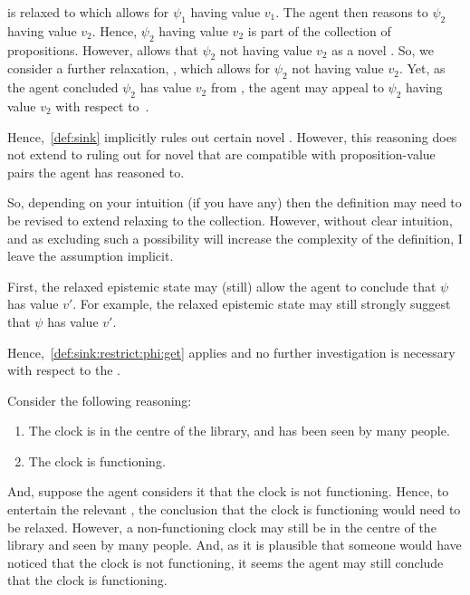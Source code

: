 \begin{note}
{    \eState{} is relaxed to  which allows for \(\psi_{1}\) having value \(v_{1}\).
    The agent then reasons to \(\psi_{2}\) having value \(v_{2}\).
    Hence, \(\psi_{2}\) having value \(v_{2}\) is part of the collection of propositions.
    However,  allows that \(\psi_{2}\) not having value \(v_{2}\) as a novel \epPAd{}.
    So, we consider a further relaxation, , which allows for \(\psi_{2}\) not having value \(v_{2}\).
    Yet, as the agent concluded \(\psi_{2}\) has value \(v_{2}\) from , the agent may appeal to \(\psi_{2}\) having value \(v_{2}\) with respect to~.

    Hence,~\autoref{def:sink} implicitly rules out certain novel \epPAd{} .
    However, this reasoning does not extend to ruling out for novel  that are compatible with proposition-value pairs the agent has reasoned to.

    So, depending on your intuition (if you have any) then the definition may need to be revised to extend relaxing to the collection.
    However, without clear intuition, and as excluding such a possibility will increase the complexity of the definition, I leave the assumption implicit.
  }
\end{note}

\begin{note}[Option 1]
  First, the relaxed epistemic state may (still) allow the agent to conclude that \(\psi\) has value \(v'\).
  For example, the relaxed epistemic state may still strongly suggest that \(\psi\) has value \(v'\).

  Hence,~\ref{def:sink:restrict:phi:get} applies and no further investigation is necessary with respect to the \epPAd{} \world{}.

  Consider the following reasoning:
  \begin{enumerate}
  \item The clock is in the centre of the library, and has been seen by many people.
  \item The clock is functioning.
  \end{enumerate}
  And, suppose the agent considers it \epPAd{} that the clock is not functioning.
  Hence, to entertain the relevant \epP{}, the conclusion that the clock is functioning would need to be relaxed.
  However, a non-functioning clock may still be in the centre of the library and seen by many people.
  And, as it is plausible that someone would have noticed that the clock is not functioning, it seems the agent may still conclude that the clock is functioning.
\end{note}

